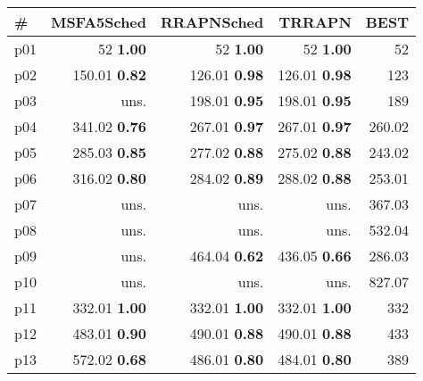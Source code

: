 \begin{tabular}{lrrrr}
\toprule
\textbf{\#} & \textbf{MSFA5Sched} & \textbf{RRAPNSched} & \textbf{TRRAPN} & \textbf{BEST}\\
\midrule
\multicolumn{1}{l|}{p01} & {\footnotesize 52} \textbf{1.00} & {\footnotesize 52} \textbf{1.00} & {\footnotesize 52} \textbf{1.00} & \multicolumn{1}{|r}{52}\\
\multicolumn{1}{l|}{p02} & {\footnotesize 150.01} \textbf{0.82} & {\footnotesize 126.01} \textbf{0.98} & {\footnotesize 126.01} \textbf{0.98} & \multicolumn{1}{|r}{123}\\
\multicolumn{1}{l|}{p03} & uns. & {\footnotesize 198.01} \textbf{0.95} & {\footnotesize 198.01} \textbf{0.95} & \multicolumn{1}{|r}{189}\\
\multicolumn{1}{l|}{p04} & {\footnotesize 341.02} \textbf{0.76} & {\footnotesize 267.01} \textbf{0.97} & {\footnotesize 267.01} \textbf{0.97} & \multicolumn{1}{|r}{260.02}\\
\multicolumn{1}{l|}{p05} & {\footnotesize 285.03} \textbf{0.85} & {\footnotesize 277.02} \textbf{0.88} & {\footnotesize 275.02} \textbf{0.88} & \multicolumn{1}{|r}{243.02}\\
\multicolumn{1}{l|}{p06} & {\footnotesize 316.02} \textbf{0.80} & {\footnotesize 284.02} \textbf{0.89} & {\footnotesize 288.02} \textbf{0.88} & \multicolumn{1}{|r}{253.01}\\
\multicolumn{1}{l|}{p07} & uns. & uns. & uns. & \multicolumn{1}{|r}{367.03}\\
\multicolumn{1}{l|}{p08} & uns. & uns. & uns. & \multicolumn{1}{|r}{532.04}\\
\multicolumn{1}{l|}{p09} & uns. & {\footnotesize 464.04} \textbf{0.62} & {\footnotesize 436.05} \textbf{0.66} & \multicolumn{1}{|r}{286.03}\\
\multicolumn{1}{l|}{p10} & uns. & uns. & uns. & \multicolumn{1}{|r}{827.07}\\
\multicolumn{1}{l|}{p11} & {\footnotesize 332.01} \textbf{1.00} & {\footnotesize 332.01} \textbf{1.00} & {\footnotesize 332.01} \textbf{1.00} & \multicolumn{1}{|r}{332}\\
\multicolumn{1}{l|}{p12} & {\footnotesize 483.01} \textbf{0.90} & {\footnotesize 490.01} \textbf{0.88} & {\footnotesize 490.01} \textbf{0.88} & \multicolumn{1}{|r}{433}\\
\multicolumn{1}{l|}{p13} & {\footnotesize 572.02} \textbf{0.68} & {\footnotesize 486.01} \textbf{0.80} & {\footnotesize 484.01} \textbf{0.80} & \multicolumn{1}{|r}{389}\\

\end{tabular}
